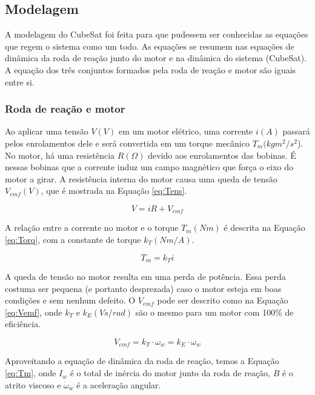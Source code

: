 \documentclass[
	12pt,				%
	openany,			%
	twoside,			%
	a4paper,			%
	english,			%
	french,				%
	spanish,			%
	brazil,				%
	oldfontcommands
	]{abntex2}
\begin{document}
\subsection{Modelagem}

A modelagem do CubeSat foi feita para que pudessem ser conhecidas as equações que regem o sistema como um todo. As equações se resumem nas equações de dinâmica da roda de reação junto do motor e na dinâmica do sistema (CubeSat). A equação dos três conjuntos formados pela roda de reação e motor são iguais entre si.

\subsubsection{Roda de reação e motor}

Ao aplicar uma tensão $V(V)$ em um motor elétrico, uma corrente $i(A)$ passará pelos enrolamentos dele e será convertida em um torque mecânico $T_{m}(kgm^{2}/s^{2}$). No motor, há uma resistência $R(\Omega)$ devido aos enrolamentos das bobinas. É nessas bobinas que a corrente induz um campo magnético que força o eixo do motor a girar. A resistência interna do motor causa uma queda de tensão $V_{emf}(V)$, que é mostrada na Equação \ref{eq:Tens}.

\begin{equation}
V = i R + V_{emf}
\label{eq:Tens}
\end{equation}

A relação entre a corrente no motor e o torque $T_{m}(Nm)$ é descrita na Equação \ref{eq:Torq}, com a constante de torque $k_{T}(Nm/A)$.

\begin{equation}
T_{m} = k_{T} i
\label{eq:Torq}
\end{equation}

A queda de tensão no motor resulta em uma perda de potência. Essa perda costuma ser pequena (e portanto desprezada) caso o motor esteja em boas condições e sem nenhum defeito. O $V_{emf}$ pode ser descrito como na Equação \ref{eq:Vemf}, onde $k_{T}$ e $k_{E}(Vs/rad)$ são o mesmo para um motor com 100\% de eficiência.

\begin{equation}
V_{emf} = k_{T} \cdot \omega_{w} = k_{E} \cdot \omega_{w}
\label{eq:Vemf}
\end{equation}

Aproveitando a equação de dinâmica da roda de reação, temos a Equação \ref{eq:Tm}, onde $I_{w}$ é o total de inércia do motor junto da roda de reação, $B$ é o atrito viscoso e $\dot{\omega}_{w}$ é a aceleração angular.
\end{document}

